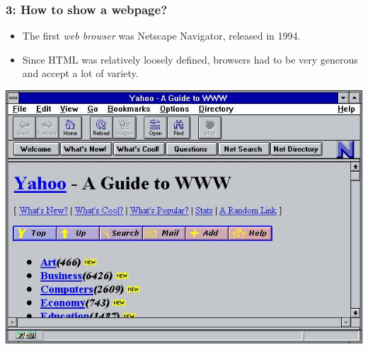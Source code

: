 \documentclass{beamer}
\begin{document}
\begin{frame}
  \frametitle{3: How to show a webpage?}

  \begin{itemize}
  \item The first \emph{web browser} was Netscape Navigator, released
    in 1994.
  \item Since HTML was relatively loosely defined, browsers had to be
    very generous and accept a lot of variety.
  \end{itemize}

  \begin{center}
    \includegraphics[height=0.5\textheight]{netscape}
  \end{center}
\end{frame}
\end{document}
